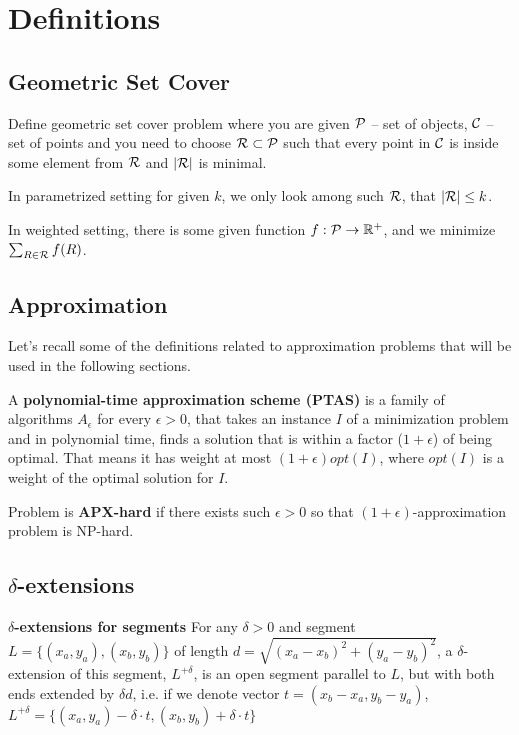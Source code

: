 \chapter{Definitions}

\section{Geometric Set Cover}

Define geometric set cover problem where you
are given
$\mathcal{P}$ -- set of objects, $\mathcal{C}$ -- set of points
and you need to choose $\mathcal{R} \subset \mathcal{P}$ such that
every point in $\mathcal{C}$ is inside some element from $\mathcal{R}$
and $|\mathcal{R}|$ is minimal.

In parametrized setting for given $k$,
we only look among such $\mathcal{R}$, that $|\mathcal{R}| \le k$.


In weighted setting, there is some given function
$f : \mathcal{P} \rightarrow \mathbb{R^+}$,
and we minimize $\sum_{R \in \mathcal{R}} f(R)$.

\section{Approximation}

Let's recall some of the definitions related to approximation problems
that will be used in the following sections.

\begin{defi}
A \textbf{polynomial-time approximation scheme (PTAS)}
is a family of algorithms $A_\epsilon$ for
every $\epsilon > 0$,
that takes an instance $I$ of a minimization problem
and in polynomial time,
finds a solution that is within a factor
($1+\epsilon$) of being optimal. That means
it has weight at most
$(1+\epsilon)opt(I)$, where $opt(I)$ is a weight
of the optimal solution for $I$.
\end{defi}

\begin{defi}
Problem is \textbf{APX-hard} if there exists such $\epsilon > 0$
so that $(1+\epsilon)$-approximation problem is NP-hard.
\end{defi}

\section{$\delta$-extensions}

\begin{defi}\textbf{$\delta$-extensions for segments}
For any $\delta > 0$ and segment $L = \{(x_a, y_a), (x_b, y_b)\}$
of length $d = \sqrt{(x_a - x_b)^2 + (y_a - y_b)^2}$,
a $\delta$-extension of this segment, $L^{+\delta}$, is an open segment
parallel to $L$, but with both ends extended by $\delta d$,
i.e. if we denote vector $t = (x_b - x_a, y_b - y_a)$,
$ L^{+\delta}
= \{ (x_a, y_a) - \delta\cdot t, (x_b, y_b) + \delta\cdot t \}$
\end{defi}

